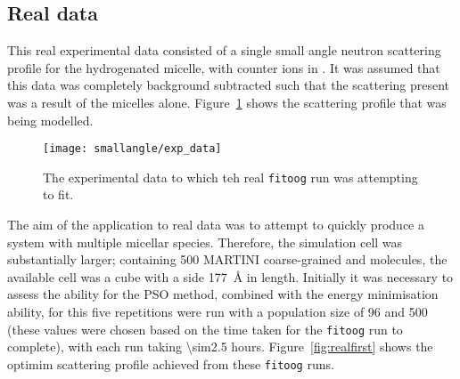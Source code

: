 \subsection{Real data}
\label{sec:real_data}
This real experimental data consisted of a single small angle neutron scattering profile for the hydrogenated  micelle, with  counter ions in .
It was assumed that this data was completely background subtracted such that the scattering present was a result of the micelles alone.
Figure~\ref{fig:expdata} shows the scattering profile that was being modelled.
%
\begin{figure}
    \centering
    \texttt{[image: smallangle/exp\_data]}
    \caption{The experimental data to which teh real \texttt{fitoog} run was attempting to fit.}
    \label{fig:expdata}
\end{figure}
%

The aim of the application to real data was to attempt to quickly produce a system with multiple micellar species.
Therefore, the simulation cell was substantially larger; containing 500 MARTINI coarse-grained  and  molecules, the available cell was a cube with a side \SI{177}{\angstrom} in length.
Initially it was necessary to assess the ability for the PSO method, combined with the energy minimisation ability, for this five repetitions were run with a population size of 96 and 500 (these values were chosen based on the time taken for the \texttt{fitoog} run to complete), with each run taking \num{\sim2.5} hours.
Figure~\ref{fig:realfirst} shows the optimim scattering profile achieved from these \texttt{fitoog} runs.
